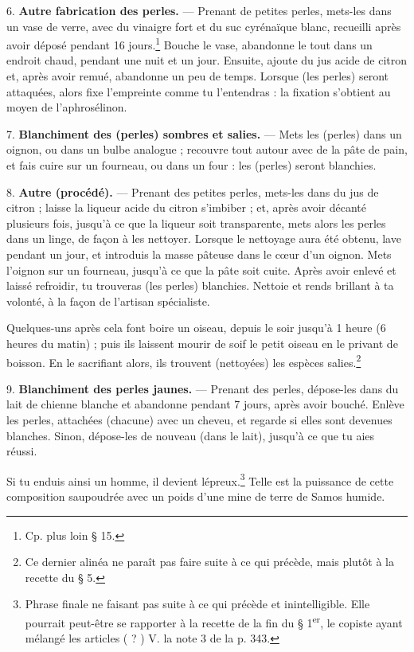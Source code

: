 \documentclass[a4paper, 11pt, oneside, polutonikogreek, french]{article}
\begin{document}
6. \textbf{Autre fabrication des perles.} --- Prenant de petites perles, mets-les dans un vase de verre, avec du vinaigre fort et du suc cyrénaïque blanc, recueilli après avoir déposé pendant 16 jours.\footnote{Cp. plus loin § 15.} Bouche le vase, abandonne le tout dans un endroit chaud, pendant une nuit et un jour. Ensuite, ajoute du jus acide de citron et, après avoir remué, abandonne un peu de temps. Lorsque (les perles) seront attaquées, alors fixe l'empreinte comme tu l'entendras : la fixation s'obtient au moyen de l'aphrosélinon.

7. \textbf{Blanchiment des (perles) sombres et salies.} --- Mets les (perles) dans un oignon, ou dans un bulbe analogue ; recouvre tout autour avec de la pâte de pain, et fais cuire sur un fourneau, ou dans un four : les (perles) seront blanchies.

8. \textbf{Autre (procédé).} --- Prenant des petites perles, mets-les dans du jus de citron ; laisse la liqueur acide du citron s'imbiber ; et, après avoir décanté plusieurs fois, jusqu'à ce que la liqueur soit transparente, mets alors les perles dans un linge, de façon à les nettoyer. Lorsque le nettoyage aura été obtenu, lave pendant un jour, et introduis la masse pâteuse dans le cœur d'un oignon. Mets l'oignon sur un fourneau, jusqu'à ce que la pâte soit cuite. Après avoir enlevé et laissé refroidir, tu trouveras (les perles) blanchies. Nettoie et rends brillant à ta volonté, à la façon de l'artisan spécialiste.

Quelques-uns après cela font boire un oiseau, depuis le soir jusqu'à 1 heure (6 heures du matin) ; puis ils laissent mourir de soif le petit oiseau en le privant de boisson. En le sacrifiant alors, ils trouvent (nettoyées) les espèces salies.\footnote{Ce dernier alinéa ne paraît pas faire suite à ce qui précède, mais plutôt à la recette du § 5.}

9. \textbf{Blanchiment des perles jaunes.} --- Prenant des perles, dépose-les dans du lait de chienne blanche et abandonne pendant 7 jours, après avoir bouché. Enlève les perles, attachées (chacune) avec un cheveu, et regarde si elles sont devenues blanches. Sinon, dépose-les de nouveau (dans le lait), jusqu'à ce que tu aies réussi.

Si tu enduis ainsi un homme, il devient lépreux.\footnote{Phrase finale ne faisant pas suite à ce qui précède et inintelligible. Elle pourrait peut-être se rapporter à la recette de la fin du § 1\textsuperscript{er}, le copiste ayant mélangé les articles ( ? ) V. la note 3 de la p. 343.} Telle est la puissance de cette composition saupoudrée avec un poids d'une mine de terre de Samos humide.
\end{document}

